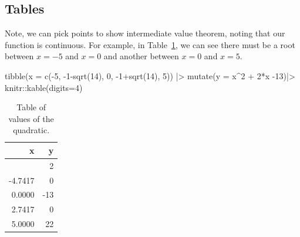 \documentclass[
]{article}
\newenvironment{Shaded}{\begin{snugshade}}{\end{snugshade}}
\newcommand{\AttributeTok}[1]{\textcolor[rgb]{0.40,0.45,0.13}{#1}}
\newcommand{\DecValTok}[1]{\textcolor[rgb]{0.68,0.00,0.00}{#1}}
\newcommand{\FunctionTok}[1]{\textcolor[rgb]{0.28,0.35,0.67}{#1}}
\newcommand{\NormalTok}[1]{\textcolor[rgb]{0.00,0.23,0.31}{#1}}
\newcommand{\SpecialCharTok}[1]{\textcolor[rgb]{0.37,0.37,0.37}{#1}}
\begin{document}
\normalsize

\subsection{Tables}\label{tables}

Note, we can pick points to show intermediate value theorem, noting that
our function is continuous. For example, in Table~\ref{tbl-points}, we
can see there must be a root between \(x = -5\) and \(x = 0\) and
another between \(x=0\) and \(x=5\).

\scriptsize

\begin{Shaded}
\begin{Highlighting}[numbers=left,,]
\FunctionTok{tibble}\NormalTok{(}\AttributeTok{x =} \FunctionTok{c}\NormalTok{(}\SpecialCharTok{{-}}\DecValTok{5}\NormalTok{, }\SpecialCharTok{{-}}\DecValTok{1}\SpecialCharTok{{-}}\FunctionTok{sqrt}\NormalTok{(}\DecValTok{14}\NormalTok{), }\DecValTok{0}\NormalTok{, }\SpecialCharTok{{-}}\DecValTok{1}\SpecialCharTok{+}\FunctionTok{sqrt}\NormalTok{(}\DecValTok{14}\NormalTok{), }\DecValTok{5}\NormalTok{)) }\SpecialCharTok{|\textgreater{}}
      \FunctionTok{mutate}\NormalTok{(}\AttributeTok{y =}\NormalTok{ x}\SpecialCharTok{\^{}}\DecValTok{2} \SpecialCharTok{+} \DecValTok{2}\SpecialCharTok{*}\NormalTok{x }\SpecialCharTok{{-}}\DecValTok{13}\NormalTok{)}\SpecialCharTok{|\textgreater{}}
\NormalTok{      knitr}\SpecialCharTok{::}\FunctionTok{kable}\NormalTok{(}\AttributeTok{digits=}\DecValTok{4}\NormalTok{)}
\end{Highlighting}
\end{Shaded}

{

\begin{longtable}[]{@{}rr@{}}

\caption{\label{tbl-points}Table of values of the quadratic.}

\tabularnewline

\toprule\noalign{}
x & y \\
\midrule\noalign{}
\endhead
\bottomrule\noalign{}
\endlastfoot
-5.0000 & 2 \\
-4.7417 & 0 \\
0.0000 & -13 \\
2.7417 & 0 \\
5.0000 & 22 \\

\end{longtable}

}
\end{document}
